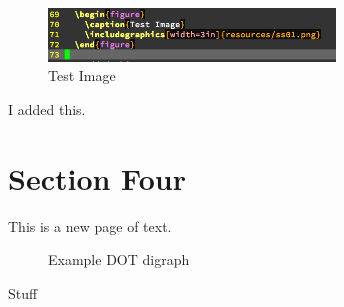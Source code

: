 \documentclass{article}
\begin{document}
\begin{figure}
  \includegraphics[width=3in]{resources/ss01.png}
  \caption{Test Image}
\end{figure}

I added this.

\newpage

\section{Section Four}
This is a new page of text.

\newpage

\begin{figure}
  \caption{Example DOT digraph}
  \label{dotgraph}
\end{figure}


Stuff
\end{document}
